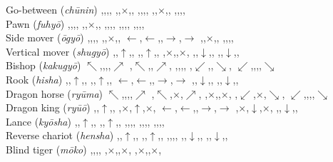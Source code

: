 \documentclass[10pt]{article}
\let\x=\times
\begin{document}
Go-between ({\it ch\=unin}) \Chu \Chunin
    \movediagramfivexfive%
        {,,,,}%
        {,,$\x$,,}%
        {,,\Chu,,}%
        {,,$\x$,,}%
        {,,,,}
\\
Pawn ({\it fuhy\=o}) \Fu
    \movediagramfivexfive%
        {,,,,}%
        {,,$\x$,,}%
        {,,\Fu,,}%
        {,,,,}%
        {,,,,}
\\
Side mover ({\it \=ogy\=o}) \Ko
    \movediagramfivexfive%
        {,,,,}%
        {,,$\x$,,}%
        {$\leftarrow$,$\leftarrow$,\Ko,$\rightarrow$,$\rightarrow$}%
        {,,$\x$,,}%
        {,,,,}
\\
Vertical mover ({\it shugy\=o}) \Ken \Kengyo
    \movediagramfivexfive%
        {,,$\uparrow$,,}%
        {,,$\uparrow$,,}%
        {,$\x$,\Ken,$\x$,}%
        {,,$\downarrow$,,}%
        {,,$\downarrow$,,}
\\
Bishop ({\it kakugy\=o}) \Kaku \Kakugyo
    \movediagramfivexfive%
        {$\nwarrow$,,,,$\nearrow$}%
        {,$\nwarrow$,,$\nearrow$,}%
        {,,\Kaku,,}%
        {,$\swarrow$,,$\searrow$,}%
        {$\swarrow$,,,,$\searrow$}
\\
Rook ({\it hisha}) \Hi \Hisha
    \movediagramfivexfive%
        {,,$\uparrow$,,}%
        {,,$\uparrow$,,}%
        {$\leftarrow$,$\leftarrow$,\Hi,$\rightarrow$,$\rightarrow$}%
        {,,$\downarrow$,,}%
        {,,$\downarrow$,,}
\\
Dragon horse ({\it ry\=uma}) \Ma \Ryume
    \movediagramfivexfive%
        {$\nwarrow$,,,,$\nearrow$}%
        {,$\nwarrow$,$\x$,$\nearrow$,}%
        {,$\x$,\Ma,$\x$,}%
        {,$\swarrow$,$\x$,$\searrow$,}%
        {$\swarrow$,,,,$\searrow$}
\\
Dragon king ({\it ry\=u\=o}) \Ryu \Ryuo
    \movediagramfivexfive%
        {,,$\uparrow$,,}%
        {,$\x$,$\uparrow$,$\x$,}%
        {$\leftarrow$,$\leftarrow$,\Ryu,$\rightarrow$,$\rightarrow$}%
        {,$\x$,$\downarrow$,$\x$,}%
        {,,$\downarrow$,,}
\\
Lance ({\it ky\=osha}) \Kyo \Kyosha
    \movediagramfivexfive%
        {,,$\uparrow$,,}%
        {,,$\uparrow$,,}%
        {,,\Kyo,,}%
        {,,,,}%
        {,,,,}
\\
Reverse chariot ({\it hensha}) \Han \Hansha
    \movediagramfivexfive%
        {,,$\uparrow$,,}%
        {,,$\uparrow$,,}%
        {,,\Han,,}%
        {,,$\downarrow$,,}%
        {,,$\downarrow$,,}
\\
Blind tiger ({\it m\=oko}) \Koii \Moko
    \movediagramfivexfive%
        {,,,,}%
        {,$\x$,,$\x$,}%
        {,$\x$,\Koii,$\x$,}%
\end{document}
